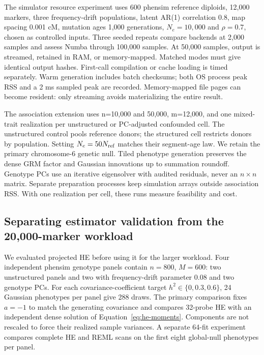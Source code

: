 \documentclass[11pt]{article}
\begin{document}
The simulator resource experiment uses 600 phensim reference diploids,
12,000 markers, three frequency-drift populations, latent AR(1) correlation
0.8, map spacing 0.001 cM, mutation ages 1,000 generations, $N_e=10,000$
and $\rho=0.7$, chosen as controlled inputs. Three seeded repeats compare backends at 2,000 samples and assess Numba
through 100,000 samples. At 50,000 samples, output is streamed, retained
in RAM, or memory-mapped. Matched modes must give identical output hashes.
First-call compilation or cache loading is timed separately. Warm generation
includes batch checksums; both OS process peak RSS and a 2 ms sampled peak
are recorded. Memory-mapped file pages can become resident: only streaming
avoids materializing the entire result.

The association extension uses n=10,000 and 50,000, m=12,000, and one
mixed-trait realization per unstructured or PC-adjusted confounded cell.
The unstructured control pools reference donors; the structured cell
restricts donors by population. Setting $N_e=50N_{\rm ref}$ matches their
segment-age law. We retain the primary chromosome-6 genetic null.
Tiled phenotype generation preserves the dense GRM factor and Gaussian
innovations up to summation roundoff. Genotype PCs use an iterative
eigensolver with audited residuals, never an $n\times n$ matrix. Separate
preparation processes keep simulation arrays outside association RSS.
With one realization per cell, these runs measure feasibility and cost.

\subsection{Separating estimator validation from the 20,000-marker workload}
\label{sec:20k-design}

We evaluated projected HE before using it for the larger workload.
Four independent phensim genotype panels contain $n=800$, $M=600$:
two unstructured panels and two with frequency-drift parameter 0.08 and
two genotype PCs. For each covariance-coefficient target
$h^2\in\{0,0.3,0.6\}$, 24 Gaussian phenotypes per panel give 288 draws.
The primary comparison fixes $a=-1$ to match the generating covariance
and compares 32-probe HE with an independent dense solution of
Equation~\eqref{eq:he-moments}. Components are not rescaled to force their
realized sample variances. A separate 64-fit experiment compares complete
HE and REML scans on the first eight global-null phenotypes per panel.
\end{document}
